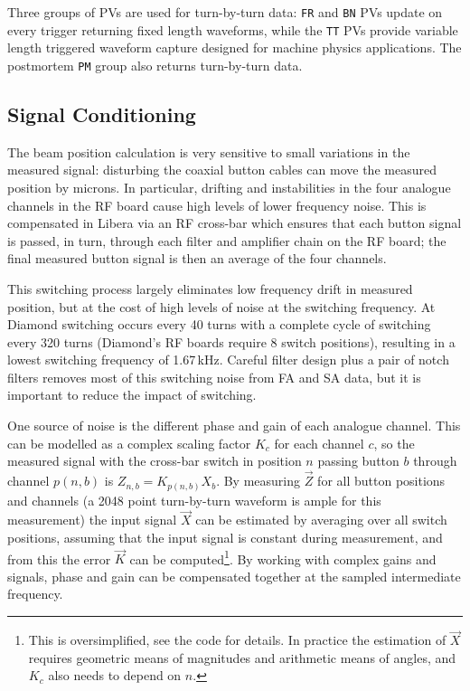\documentclass{JAC2003}
\begin{document}
Three groups of PVs are used for turn-by-turn data: \texttt{FR} and
\texttt{BN} PVs update on every trigger returning fixed length waveforms,
while the \texttt{TT} PVs provide variable length triggered waveform capture
designed for machine physics applications.  The postmortem \texttt{PM} group
also returns turn-by-turn data.


\subsection{Signal Conditioning}

The beam position calculation is very sensitive to small variations in the
measured signal: disturbing the coaxial button cables can move the measured
position by microns.  In particular, drifting and instabilities in the four
analogue channels in the RF board cause high levels of lower frequency noise.
This is compensated in Libera via an RF cross-bar which ensures that each
button signal is passed, in turn, through each filter and amplifier chain on
the RF board; the final measured button signal is then an average of the four
channels.

This switching process largely eliminates low frequency drift in measured
position, but at the cost of high levels of noise at the switching frequency.
At Diamond switching occurs every 40 turns with a complete cycle of switching
every 320 turns (Diamond's RF boards require 8 switch positions), resulting in
a lowest switching frequency of 1.67\,kHz.  Careful filter design plus a pair
of notch filters removes most of this switching noise from FA and SA data, but
it is important to reduce the impact of switching.

One source of noise is the different phase and gain of each analogue channel.
This can be modelled as a complex scaling factor $K_c$ for each channel $c$,
so the measured signal with the cross-bar switch in position $n$ passing
button $b$ through channel $p(n,b)$ is $Z_{n,b} = K_{p(n,b)} X_b$.  By
measuring $\vec{Z}$ for all button positions and channels (a 2048 point
turn-by-turn waveform is ample for this measurement) the input signal
$\vec{X}$ can be estimated by averaging over all switch positions, assuming
that the input signal is constant during measurement, and from this the error
$\vec{K}$ can be computed\footnote{%
%
    This is oversimplified, see the code\cite{libera-epics-web} for details.
    In practice the estimation of $\vec{X}$ requires geometric means of
    magnitudes and arithmetic means of angles, and $K_c$ also needs to depend
    on $n$.
%
}.  By working with complex gains and signals, phase and gain can be
compensated together at the sampled intermediate frequency.
\end{document}
